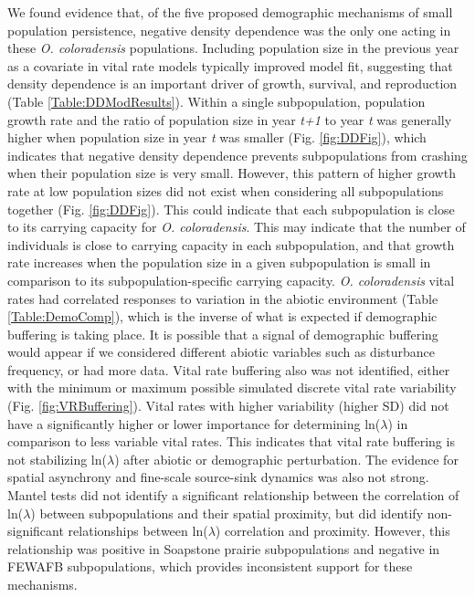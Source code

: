 \documentclass[12pt, letterpaper]{article}
\begin{document}
We found evidence that, of the five proposed demographic mechanisms of small population persistence, negative density dependence was the only one acting in these \textit{O. coloradensis} populations. Including population size in the previous year as a covariate in vital rate models typically improved model fit, suggesting that density dependence is an important driver of growth, survival, and reproduction (Table \ref{Table:DDModResults}). Within a single subpopulation, population growth rate and the ratio of population size in year \textit{t+1} to year \textit{t} was generally higher when population size in year \textit{t} was smaller (Fig. \ref{fig:DDFig}), which indicates that negative density dependence prevents subpopulations from crashing when their population size is very small.  However, this pattern of higher growth rate at low population sizes did not exist when considering all subpopulations together (Fig. \ref{fig:DDFig}). This could indicate that each subpopulation is close to its carrying capacity for \textit{O. coloradensis}. This may indicate that the number of individuals is close to carrying capacity in each subpopulation, and that growth rate increases when the population size in a given subpopulation is small in comparison to its subpopulation-specific carrying capacity. \textit{O. coloradensis} vital rates had correlated responses to variation in the abiotic environment (Table \ref{Table:DemoComp}), which is the inverse of what is expected if demographic buffering is taking place. It is possible that a signal of demographic buffering would appear if we considered different abiotic variables such as disturbance frequency, or had more data. Vital rate buffering also was not identified, either with the minimum or maximum possible simulated discrete vital rate variability (Fig. \ref{fig:VRBuffering}). Vital rates with higher variability (higher SD) did not have a significantly higher or lower importance for determining ln($\lambda$) in comparison to less variable vital rates. This indicates that vital rate buffering is not stabilizing ln($\lambda$) after abiotic or demographic perturbation. The evidence for spatial asynchrony and fine-scale source-sink dynamics was also not strong. Mantel tests did not identify a significant relationship between the correlation of ln($\lambda$) between subpopulations and their spatial proximity, but did identify non-significant relationships between ln($\lambda$) correlation and proximity. However, this relationship was positive in Soapstone prairie subpopulations and negative in FEWAFB subpopulations, which provides inconsistent support for these mechanisms.  
\end{document}
